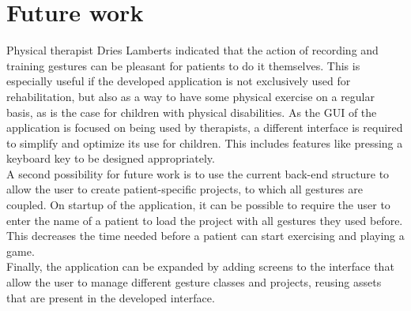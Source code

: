 \section{Future work}

Physical therapist Dries Lamberts indicated that the action of recording and training gestures can be pleasant for patients to do it themselves. This is especially useful if the developed application is not exclusively used for rehabilitation, but also as a way to have some physical exercise on a regular basis, as is the case for children with physical disabilities. As the GUI of the application is focused on being used by therapists, a different interface is required to simplify and optimize its use for children. This includes features like pressing a keyboard key to be designed appropriately.\\

A second possibility for future work is to use the current back-end structure to allow the user to create patient-specific projects, to which all gestures are coupled. On startup of the application, it can be possible to require the user to enter the name of a patient to load the project with all gestures they used before. This decreases the time needed before a patient can start exercising and playing a game.\\

Finally, the application can be expanded by adding screens to the interface that allow the user to manage different gesture classes and projects, reusing assets that are present in the developed interface.
